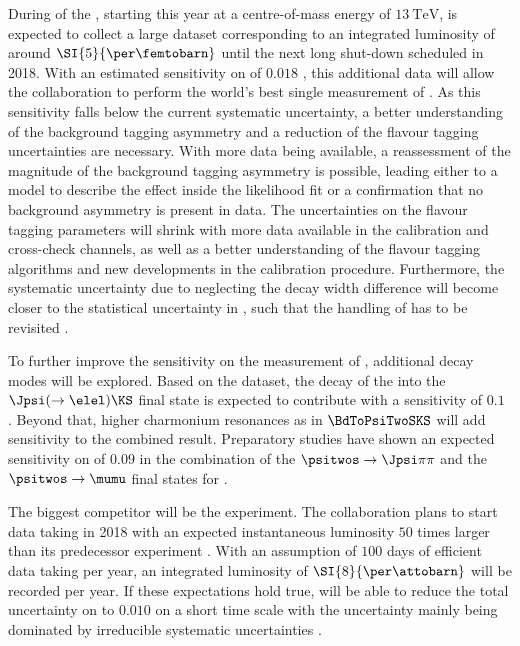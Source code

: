 During \RunTwo of the \LHC, starting this year at a centre-of-mass energy of
$\SI{13}{\TeV}$, \LHCb is expected to collect a large dataset corresponding to
an integrated luminosity of around $\SI{5}{\per\femtobarn}$ until the next long
shut-down scheduled in 2018. With an estimated sensitivity on \SJpsiKS of
$\num{0.018}$ \cite{Moedden:2015}, this additional data will allow the \LHCb
collaboration to perform the world's best single measurement of \sintwobeta. As
this sensitivity falls below the current systematic uncertainty, a better
understanding of the background tagging asymmetry and a reduction of the flavour
tagging uncertainties are necessary. With more data being available, a
reassessment of the magnitude of the background tagging asymmetry is possible,
leading either to a model to describe the effect inside the likelihood fit or a
confirmation that no background asymmetry is present in data. The uncertainties
on the flavour tagging parameters will shrink with more data available in the
calibration and cross-check channels, as well as a better understanding of the
flavour tagging algorithms and new developments in the calibration procedure.
Furthermore, the systematic uncertainty due to neglecting the decay width
difference \DGd will become closer to the statistical uncertainty in \RunTwo,
such that the handling of \DGd has to be revisited
\cite{Moedden:2015}.

To further improve the sensitivity on the measurement of \sintwobeta, additional
decay modes will be explored. Based on the \RunOne dataset, the decay of the \Bd
into the $\Jpsi (\to\elel) \KS$ final state is expected to contribute with a
sensitivity of $\num{0.1}$ \cite{bdtojpsieeks:ramon}. Beyond that, higher
charmonium resonances as in $\BdToPsiTwoSKS$ will add sensitivity to the
combined result. Preparatory studies have shown an expected sensitivity on
\sintwobeta of $\num{0.09}$ in the combination of the $\psitwos\to\Jpsi\pi\pi$
and the $\psitwos\to\mumu$ final states for \RunOne \cite{Mueller:2014}.

The biggest \LHCb competitor will be the \BelleTwo experiment. The collaboration
plans to start data taking in 2018 with an expected instantaneous luminosity
$\num{50}$ times larger than its predecessor experiment \Belle. With an
assumption of $\num{100}$ days of efficient data taking per year, an integrated
luminosity of $\SI{8}{\per\attobarn}$ will be recorded per year. If these
expectations hold true, \BelleTwo will be able to reduce the total uncertainty
on \sintwobeta to $\num{0.010}$ on a short time scale with the uncertainty
mainly being dominated by irreducible systematic uncertainties
\cite{Aushev:2010bq}.

